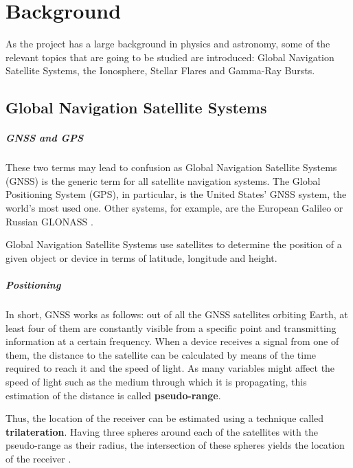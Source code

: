 \chapter{Background}
As the project has a large background in physics and astronomy, some of the relevant topics that are going to be studied are introduced: Global Navigation Satellite Systems, the Ionosphere, Stellar Flares and Gamma-Ray Bursts.

\section{Global Navigation Satellite Systems}

\paragraph{GNSS and GPS}

These two terms may lead to confusion as Global Navigation Satellite Systems (GNSS) is the generic term for all satellite navigation systems. The Global Positioning System (GPS), in particular, is the United States' GNSS system, the world's most used one. Other systems, for example, are the European Galileo or Russian GLONASS \cite{hegarty2008evolution}.

Global Navigation Satellite Systems use satellites to determine the position of a given object or device in terms of latitude, longitude and height. 

\paragraph{Positioning}

In short, GNSS works as follows: out of all the GNSS satellites orbiting Earth, at least four of them are constantly visible from a specific point and transmitting information at a certain frequency. When a device receives a signal from one of them, the distance to the satellite can be calculated by means of the time required to reach it and the speed of light. As many variables might affect the speed of light such as the medium through which it is propagating, this estimation of the distance is called \textbf{pseudo-range}. 

Thus, the location of the receiver can be estimated using a technique called \textbf{trilateration}. Having three spheres around each of the satellites with the pseudo-range as their radius, the intersection of these spheres yields the location of the receiver \cite{hofmann2007gnss}. 

